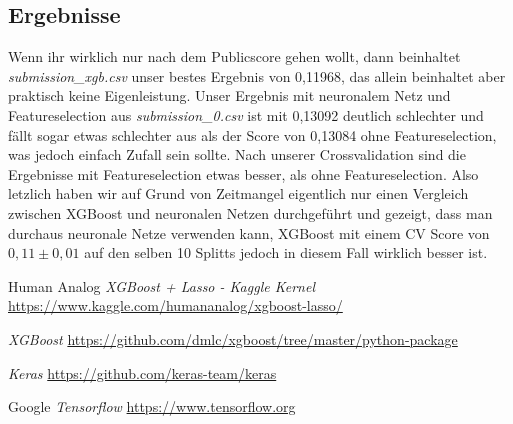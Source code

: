 \documentclass[a4paper, 11pt]{article}
\begin{document}
\subsection*{Ergebnisse}
Wenn ihr wirklich nur nach dem Publicscore gehen wollt, dann beinhaltet \textit{submission\_xgb.csv} unser bestes Ergebnis von 0,11968, das allein beinhaltet aber praktisch keine Eigenleistung. Unser Ergebnis mit neuronalem Netz und Featureselection aus \textit{submission\_0.csv} ist mit 0,13092 deutlich schlechter und fällt sogar etwas schlechter aus als der Score von 0,13084 ohne Featureselection, was jedoch einfach Zufall sein sollte. Nach unserer Crossvalidation sind die Ergebnisse mit Featureselection etwas besser, als ohne Featureselection. Also letzlich haben wir auf Grund von Zeitmangel eigentlich nur einen Vergleich zwischen XGBoost und neuronalen Netzen durchgeführt und gezeigt, dass man durchaus neuronale Netze verwenden kann, XGBoost mit einem CV Score von $0,11 \pm 0,01$ auf den selben 10 Splitts jedoch in diesem Fall wirklich besser ist.

\begin{thebibliography}{9}
    Human Analog
    \textit{XGBoost + Lasso - Kaggle Kernel}
    \url{https://www.kaggle.com/humananalog/xgboost-lasso/}

    \textit{XGBoost}
    \url{https://github.com/dmlc/xgboost/tree/master/python-package}

    \textit{Keras}
    \url{https://github.com/keras-team/keras}

    Google
    \textit{Tensorflow}
    \url{https://www.tensorflow.org}
\end{thebibliography}
\end{document}
